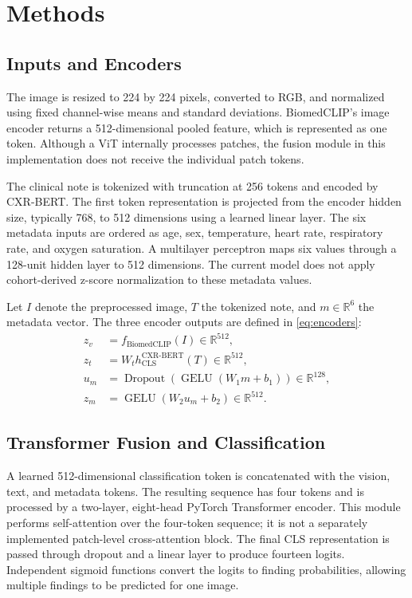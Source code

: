 \documentclass[conference]{IEEEtran}
\begin{document}
\section{Methods}
\subsection{Inputs and Encoders}
The image is resized to 224 by 224 pixels, converted to RGB, and normalized using fixed channel-wise means and standard deviations. BiomedCLIP's image encoder returns a 512-dimensional pooled feature, which is represented as one token. Although a ViT internally processes patches, the fusion module in this implementation does not receive the individual patch tokens.

The clinical note is tokenized with truncation at 256 tokens and encoded by CXR-BERT. The first token representation is projected from the encoder hidden size, typically 768, to 512 dimensions using a learned linear layer. The six metadata inputs are ordered as age, sex, temperature, heart rate, respiratory rate, and oxygen saturation. A multilayer perceptron maps six values through a 128-unit hidden layer to 512 dimensions. The current model does not apply cohort-derived z-score normalization to these metadata values.

Let $I$ denote the preprocessed image, $T$ the tokenized note, and $m\in\mathbb{R}^{6}$ the metadata vector. The three encoder outputs are defined in \eqref{eq:encoders}:
\begin{align}
z_v &= f_{\mathrm{BiomedCLIP}}(I) \in \mathbb{R}^{512}, \\
z_t &= W_t h_{\mathrm{CLS}}^{\mathrm{CXR\text{-}BERT}}(T) \in \mathbb{R}^{512}, \\
u_m &= \operatorname{Dropout}(\operatorname{GELU}(W_1m+b_1)) \in \mathbb{R}^{128}, \\
z_m &= \operatorname{GELU}(W_2u_m+b_2) \in \mathbb{R}^{512}.
\label{eq:encoders}
\end{align}

\subsection{Transformer Fusion and Classification}
A learned 512-dimensional classification token is concatenated with the vision, text, and metadata tokens. The resulting sequence has four tokens and is processed by a two-layer, eight-head PyTorch Transformer encoder. This module performs self-attention over the four-token sequence; it is not a separately implemented patch-level cross-attention block. The final CLS representation is passed through dropout and a linear layer to produce fourteen logits. Independent sigmoid functions convert the logits to finding probabilities, allowing multiple findings to be predicted for one image.
\end{document}
